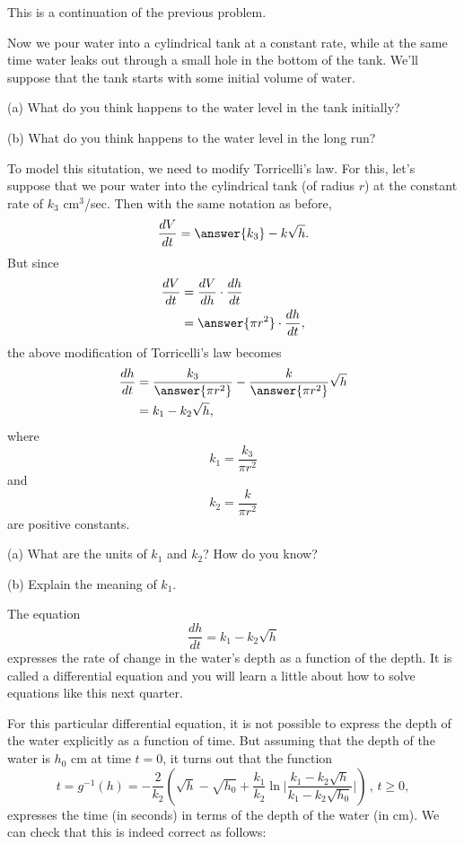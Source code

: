 \documentclass{ximera}
\begin{document}
\begin{question}  \label{Q:435gbbrtgt}
This is a continuation of the previous problem.

Now we pour water into a cylindrical tank at a constant rate, while at the same time water leaks out through a small hole in the bottom of the tank. We'll suppose that the tank starts with some initial volume of water.

\begin{freeResponse}

(a) What do you think happens to the water level in the tank initially?

(b) What do you think happens to the water level in the long run?

\end{freeResponse}

To model this situtation, we need to modify Torricelli's law. For this, let's suppose that we pour water into the cylindrical tank (of radius $r$) at the constant rate of $k_3 \text{ cm}^3$/sec. Then with the same notation as before,
\[
      \frac{dV}{dt} = \answer{k_3} - k\sqrt{h} . 
\] 
But since 
\begin{align*}
        \frac{dV}{dt} &= \frac{dV}{dh} \cdot \frac{dh}{dt}   \\
                            & = \answer{\pi r^2} \cdot \frac{dh}{dt} ,
\end{align*}
the above modification of Torricelli's law becomes
\begin{align*}
    \frac{dh}{dt} &=  \frac{k_3}{\answer{\pi r^2}} - \frac{k}{\answer{\pi r^2}}\sqrt{h} \\
                        &= k_1 - k_2 \sqrt{h} ,
\end{align*}
where 
\[
    k_1  = \frac{k_3}{\pi r^2} 
\]
and
\[
        k_2 = \frac{k}{\pi r^2} 
\]
are positive constants. 

\begin{freeResponse}
(a) What are the units of $k_1$ and $k_2$? How do you know?

(b) Explain the meaning of $k_1$.
\end{freeResponse}

The equation
\[
   \frac{dh}{dt} =  k_1 - k_2 \sqrt{h} 
\]
expresses the rate of change in the water's depth as a function of the depth. It is called a differential equation and you will learn a little about how to solve equations like this next quarter. 
 
For this particular differential equation, it is not possible to express the depth of the water explicitly as a function of time. But assuming that the depth of the water is $h_0$ cm at time $t=0$, it turns out that the function 
\[
      t = g^{-1}(h) = - \frac{2}{k_2}  \left( \sqrt{h} - \sqrt{h_0} + \frac{k_1}{k_2} \ln \Bigg| \frac{k_1 - k_2 \sqrt{h}}{k_1 - k_2 \sqrt{h_0}}   \Bigg| \right)\, , \, t\geq 0 ,
\]
expresses the time (in seconds) in terms of the depth of the water (in cm). We can check that this is indeed correct as follows:


\end{question}
\end{document}
